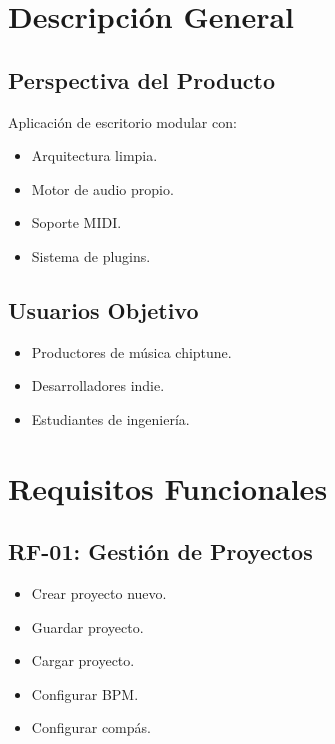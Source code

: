 \documentclass[12pt]{article}
\begin{document}
\section{Descripción General}

\subsection{Perspectiva del Producto}

Aplicación de escritorio modular con:

\begin{itemize}
\item Arquitectura limpia.
\item Motor de audio propio.
\item Soporte MIDI.
\item Sistema de plugins.
\end{itemize}

\subsection{Usuarios Objetivo}

\begin{itemize}
\item Productores de música chiptune.
\item Desarrolladores indie.
\item Estudiantes de ingeniería.
\end{itemize}

\section{Requisitos Funcionales}

\subsection{RF-01: Gestión de Proyectos}

\begin{itemize}
\item Crear proyecto nuevo.
\item Guardar proyecto.
\item Cargar proyecto.
\item Configurar BPM.
\item Configurar compás.
\end{itemize}
\end{document}
